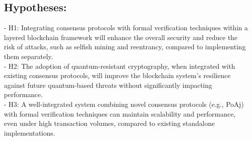 \documentclass[a4paper, 12pt]{article}
\begin{document}
\subsection{Hypotheses:}
- H1: Integrating consensus protocols with formal verification techniques within a layered blockchain framework will enhance the overall security and reduce the risk of attacks, such as selfish mining and reentrancy, compared to implementing them separately.
\\
- H2: The adoption of quantum-resistant cryptography, when integrated with existing consensus protocols, will improve the blockchain system’s resilience against future quantum-based threats without significantly impacting performance.
\\
- H3: A well-integrated system combining novel consensus protocols (e.g., PoAj) with formal verification techniques can maintain scalability and performance, even under high transaction volumes, compared to existing standalone implementations.
\end{document}
